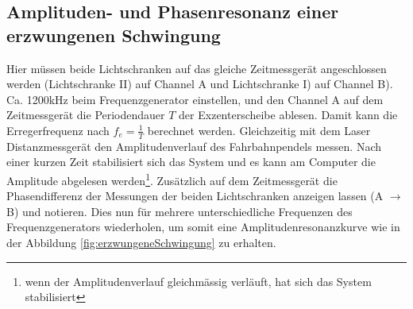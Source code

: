 \subsection{Amplituden- und Phasenresonanz einer erzwungenen Schwingung}
Hier müssen beide Lichtschranken auf das gleiche Zeitmessgerät angeschlossen werden (Lichtschranke II) auf Channel A und Lichtschranke I) auf Channel B). Ca. 1200kHz beim Frequenzgenerator einstellen, und den Channel A auf dem Zeitmessgerät die Periodendauer $T$ der Exzenterscheibe ablesen. Damit kann die Erregerfrequenz nach $f_{e} = \frac{1}{T}$ berechnet werden. Gleichzeitig mit dem Laser Distanzmessgerät den Amplitudenverlauf des Fahrbahnpendels messen. Nach einer kurzen Zeit \glqq stabilisiert\grqq\: sich das System und es kann am Computer die Amplitude abgelesen werden\footnote{wenn der Amplitudenverlauf gleichmässig verläuft, hat sich das System stabilisiert}. Zusätzlich auf dem Zeitmessgerät die Phasendifferenz der Messungen der beiden Lichtschranken anzeigen lassen (A $\rightarrow$ B) und notieren. Dies nun für mehrere unterschiedliche Frequenzen des Frequenzgenerators wiederholen, um somit eine Amplitudenresonanzkurve wie in der Abbildung \ref{fig:erzwungeneSchwingung} zu erhalten.
